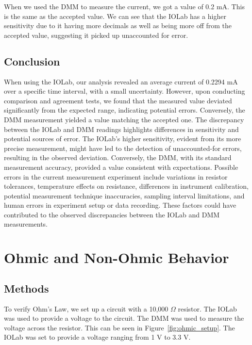 \documentclass[11pt]{article}
\let\oldsection\section
\renewcommand\section{\clearpage\oldsection}
\begin{document}
    When we used the DMM to measure the current, we got a value of 0.2 mA. This is the same as the accepted value.
    We can see that the IOLab has a higher sensitivity due to it having more decimals as well as being more off from the accepted value, suggesting it picked up unaccounted for error.

    \subsection{Conclusion}\label{subsec:current_conclusion}

    When using the IOLab, our analysis revealed an average current of 0.2294 mA over a specific time interval, with a small uncertainty.
    However, upon conducting comparison and agreement tests, we found that the measured value deviated significantly from the expected range, indicating potential errors.
    Conversely, the DMM measurement yielded a value matching the accepted one.
    The discrepancy between the IOLab and DMM readings highlights differences in sensitivity and potential sources of error.
    The IOLab's higher sensitivity, evident from its more precise measurement, might have led to the detection of unaccounted-for errors, resulting in the observed deviation.
    Conversely, the DMM, with its standard measurement accuracy, provided a value consistent with expectations.
    Possible errors in the current measurement experiment include variations in resistor tolerances, temperature effects on resistance, differences in instrument calibration, potential measurement technique inaccuracies, sampling interval limitations, and human errors in experiment setup or data recording.
    These factors could have contributed to the observed discrepancies between the IOLab and DMM measurements.

    \renewcommand\thesection{\arabic{section}}
    \section{Ohmic and Non-Ohmic Behavior}\label{sec:ohmic}

    \subsection{Methods}\label{subsec:ohmic_methods}

    To verify Ohm's Law, we set up a circuit with a 10,000 $\Omega$ resistor.
    The IOLab was used to provide a voltage to the circuit.
    The DMM was used to measure the voltage across the resistor.
    This can be seen in Figure~\ref{fig:ohmic_setup}.
    The IOLab was set to provide a voltage ranging from 1 V to 3.3 V\@.
\end{document}
